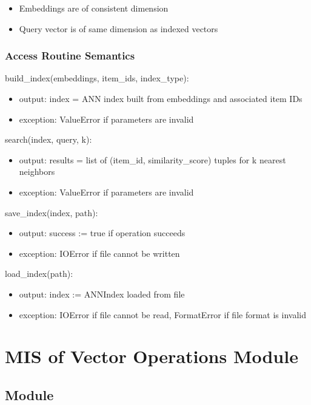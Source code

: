 \documentclass[12pt, titlepage]{article}
\begin{document}
\begin{itemize}
  \item Embeddings are of consistent dimension
  \item Query vector is of same dimension as indexed vectors
\end{itemize}

\subsubsection{Access Routine Semantics}

\noindent build\_index(embeddings, item\_ids, index\_type):
\begin{itemize}
\item output: index = ANN index built from embeddings and associated item IDs
\item exception: ValueError if parameters are invalid
\end{itemize}

\noindent search(index, query, k):
\begin{itemize}
\item output: results = list of (item\_id, similarity\_score) tuples for k nearest neighbors
\item exception: ValueError if parameters are invalid
\end{itemize}

\noindent save\_index(index, path):
\begin{itemize}
\item output: success := true if operation succeeds
\item exception: IOError if file cannot be written
\end{itemize}

\noindent load\_index(path):
\begin{itemize}
  \item output: index := ANNIndex loaded from file
  \item exception: IOError if file cannot be read, FormatError if file format is invalid
\end{itemize}

\section{MIS of Vector Operations Module} \label{ModuleVO}

\subsection{Module}
\end{document}
